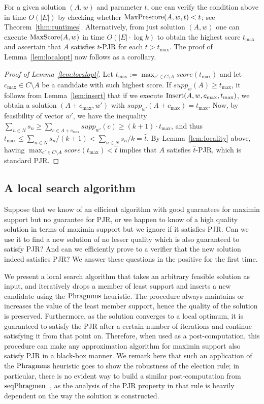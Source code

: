 For a given solution $(A,w)$ and parameter $t$, one can verify the condition above in time $O(|E|)$ by checking whether $\operatorname{MaxPrescore}(A,w,t)<t$; see Theorem~\ref{thm:runtimes}. Alternatively, from just solution $(A,w)$ one can execute $\operatorname{MaxScore}(A,w)$ in time $O(|E|\cdot \log k)$ to obtain the highest score $t_{\max}$ and ascertain that $A$ satisfies $t$-PJR for each $t>t_{\max}$. 
The proof of Lemma~\ref{lem:localopt} now follows as a corollary.

\begin{proof}[Proof of Lemma~\ref{lem:localopt}]
Let $t_{\max}:=\max_{c'\in C\setminus A} score(t_{\max})$ and let $c_{\max}\in C\setminus A$ be a candidate with such highest score. 
If $supp_w(A)\geq t_{\max}$, it follows from Lemma~\ref{lem:insert} that if we execute $\operatorname{Insert}(A,w,c_{\max}, t_{\max})$, we obtain a solution $(A+c_{\max}, w')$ with $supp_{w'}(A+c_{\max})=t_{\max}$. 
Now, by feasibility of vector $w'$, we have the inequality $\sum_{n\in N} s_n \geq \sum_{c\in A+c_{\max}} supp_{w'}(c) \geq (k+1)\cdot t_{\max}$, and thus $t_{\max}\leq \sum_{n\in N} s_n / (k+1) < \sum_{n\in N} s_n / k = \hat{t}$. 
By Lemma~\ref{lem:locality} above, having $\max_{c'\in C\setminus A} score(t_{\max}) < \hat{t}$ implies that $A$ satisfies $\hat{t}$-PJR, which is standard PJR.
\end{proof}

\subsection{A local search algorithm}\label{s:LS}

Suppose that we know of an efficient algorithm with good guarantees for maximin support but no guarantee for PJR, or we happen to know of a high quality solution in terms of maximin support but we ignore if it satisfies PJR. Can we use it to find a new solution of no lesser quality which is also guaranteed to satisfy PJR? And can we efficiently prove to a verifier that the new solution indeed satisfies PJR? We answer these questions in the positive for the first time.

We present a local search algorithm that takes an arbitrary feasible solution as input, and iteratively drops a member of least support and inserts a new candidate using the $\operatorname{Phragmms}$ heuristic. The procedure always maintains or increases the value of the least member support, hence the quality of the solution is preserved. Furthermore, as the solution converges to a local optimum, it is guaranteed to satisfy the PJR after a certain number of iterations and continue satisfying it from that point on. 
Therefore, when used as a post-computation, this procedure can make any approximation algorithm for maximin support also satisfy PJR in a black-box manner. 
We remark here that such an application of the $\operatorname{Phragmms}$ heuristic goes to show the robustness of the election rule; in particular, there is no evident way to build a similar post-computation from $\operatorname{seqPhragmen}$~\cite{brill2017phragmen}, as the analysis of the PJR property in that rule is heavily dependent on the way the solution is constructed. 


